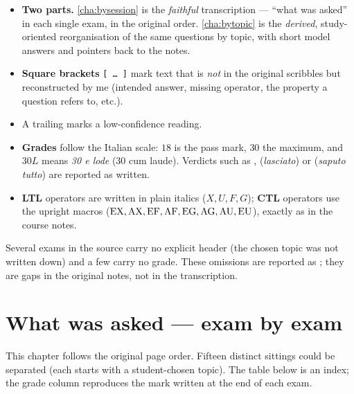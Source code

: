 \documentclass[oneside]{academica}
\begin{document}
\begin{itemize}
  \item \textbf{Two parts.} \autoref{cha:bysession} is the
    \emph{faithful} transcription --- ``what was asked'' in each single
    exam, in the original order. \autoref{cha:bytopic} is the
    \emph{derived}, study-oriented reorganisation of the same questions
    by topic, with short model answers and pointers back to the notes.
  \item \textbf{Square brackets} \texttt{[\,\ldots\,]} mark text that is
    \emph{not} in the original scribbles but reconstructed by me
    (intended answer, missing operator, the property a question refers
    to, etc.).
  \item A trailing  marks a low-confidence reading.
  \item \textbf{Grades} follow the Italian scale: $18$ is the pass mark,
    $30$ the maximum, and $30L$ means \emph{30 e lode} (30 cum laude).
    Verdicts such as , 
    (\textit{lasciato}) or  (\textit{saputo
    tutto}) are reported as written.
  \item \textbf{LTL} operators are written in plain italics
    ($X,U,F,G$); \textbf{CTL} operators use the upright macros
    ($\mathrm{EX},\mathrm{AX},\mathrm{EF},\mathrm{AF},\mathrm{EG},\mathrm{AG},\mathrm{AU},\mathrm{EU}$), exactly as in the course notes.
\end{itemize}

\begin{note}
  Several exams in the source carry no explicit  header
  (the chosen topic was not written down) and a few carry no grade.
  These omissions are reported as ; they are gaps
  in the original notes, not in the transcription.
\end{note}

\chapter{What was asked --- exam by exam}\label{cha:bysession}

This chapter follows the original page order. Fifteen distinct sittings
could be separated (each starts with a student-chosen topic). The table
below is an index; the grade column reproduces the mark written at the
end of each exam.
\end{document}

